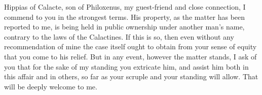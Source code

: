 

 Hippias of Calacte, son of Philoxenus, my guest-friend and close connection, I commend to you in the strongest terms. His property, as the matter has been reported to me, is being held in public ownership under another man's name, contrary to the laws of the Calactines. If this is so, then even without any recommendation of mine the case itself ought to obtain from your sense of equity that you come to his relief. But in any event, however the matter stands, I ask of you that for the sake of my standing you extricate him, and assist him both in this affair and in others, so far as your scruple and your standing will allow. That will be deeply welcome to me.
